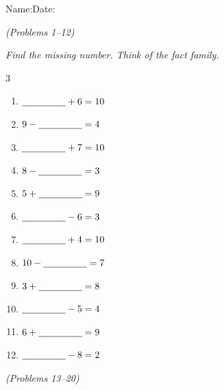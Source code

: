 \documentclass[12pt, letterpaper]{article}
\begin{document}

{\small Name:\ansblanklg \hfill Date:\ansblank}
\goldrule

 \hfill \textit{(Problems 1–12)}

\medskip\noindent\textit{Find the missing number. Think of the fact family.}

\bigskip
\begin{multicols}{3}
\begin{enumerate}[leftmargin=*,label=\textbf{\arabic*.},itemsep=10pt]
  \item $\underline{\hspace{1.6cm}}+6=10$
  \item $9-\underline{\hspace{1.6cm}}=4$
  \item $\underline{\hspace{1.6cm}}+7=10$
  \item $8-\underline{\hspace{1.6cm}}=3$
  \item $5+\underline{\hspace{1.6cm}}=9$
  \item $\underline{\hspace{1.6cm}}-6=3$
  \item $\underline{\hspace{1.6cm}}+4=10$
  \item $10-\underline{\hspace{1.6cm}}=7$
  \item $3+\underline{\hspace{1.6cm}}=8$
  \item $\underline{\hspace{1.6cm}}-5=4$
  \item $6+\underline{\hspace{1.6cm}}=9$
  \item $\underline{\hspace{1.6cm}}-8=2$
\end{enumerate}
\end{multicols}

\bigskip\bigskip
{} \hfill \textit{(Problems 13–20)}
\end{document}

